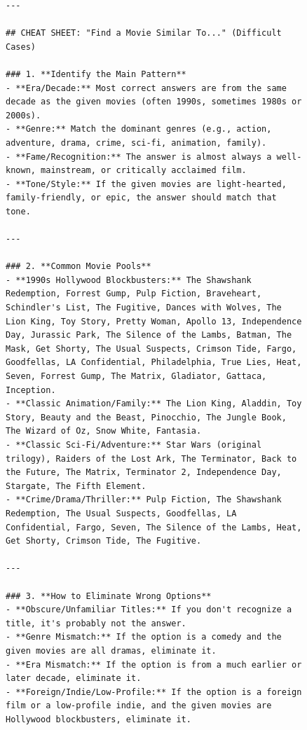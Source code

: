 \begin{figure}[t]
\centering
\begin{tcolorbox}[title=Cheat Sheet for Movie Recommendation (1/2), colback=gray!10, colframe=black!70, boxrule=0.5pt, top=0pt, bottom=0pt, left=0pt, right=0pt, arc=0.8mm, width=1.0\textwidth]
\scriptsize
\begin{lstlisting}
---

## CHEAT SHEET: "Find a Movie Similar To..." (Difficult Cases)

### 1. **Identify the Main Pattern**
- **Era/Decade:** Most correct answers are from the same decade as the given movies (often 1990s, sometimes 1980s or 2000s).
- **Genre:** Match the dominant genres (e.g., action, adventure, drama, crime, sci-fi, animation, family).
- **Fame/Recognition:** The answer is almost always a well-known, mainstream, or critically acclaimed film.
- **Tone/Style:** If the given movies are light-hearted, family-friendly, or epic, the answer should match that tone.

---

### 2. **Common Movie Pools**
- **1990s Hollywood Blockbusters:** The Shawshank Redemption, Forrest Gump, Pulp Fiction, Braveheart, Schindler's List, The Fugitive, Dances with Wolves, The Lion King, Toy Story, Pretty Woman, Apollo 13, Independence Day, Jurassic Park, The Silence of the Lambs, Batman, The Mask, Get Shorty, The Usual Suspects, Crimson Tide, Fargo, Goodfellas, LA Confidential, Philadelphia, True Lies, Heat, Seven, Forrest Gump, The Matrix, Gladiator, Gattaca, Inception.
- **Classic Animation/Family:** The Lion King, Aladdin, Toy Story, Beauty and the Beast, Pinocchio, The Jungle Book, The Wizard of Oz, Snow White, Fantasia.
- **Classic Sci-Fi/Adventure:** Star Wars (original trilogy), Raiders of the Lost Ark, The Terminator, Back to the Future, The Matrix, Terminator 2, Independence Day, Stargate, The Fifth Element.
- **Crime/Drama/Thriller:** Pulp Fiction, The Shawshank Redemption, The Usual Suspects, Goodfellas, LA Confidential, Fargo, Seven, The Silence of the Lambs, Heat, Get Shorty, Crimson Tide, The Fugitive.

---

### 3. **How to Eliminate Wrong Options**
- **Obscure/Unfamiliar Titles:** If you don't recognize a title, it's probably not the answer.
- **Genre Mismatch:** If the option is a comedy and the given movies are all dramas, eliminate it.
- **Era Mismatch:** If the option is from a much earlier or later decade, eliminate it.
- **Foreign/Indie/Low-Profile:** If the option is a foreign film or a low-profile indie, and the given movies are Hollywood blockbusters, eliminate it.


\end{lstlisting}
\end{tcolorbox}
\end{figure}
